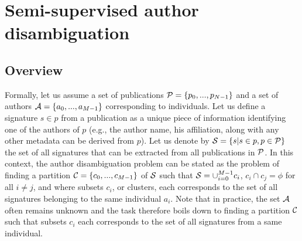 \documentclass{article}
\begin{document}

\section{Semi-supervised author disambiguation}
\label{methods}

\subsection{Overview}

Formally, let us assume a set of publications ${\cal P} = \{ p_0, ...,
p_{N-1}\}$ and a set of authors ${\cal A} = \{ a_0, ..., a_{M-1}\}$
corresponding to individuals.  Let us define a signature $s \in p$ from a
publication as a unique piece of information identifying one of the authors of
$p$ (e.g., the author name, his affiliation, along with any other metadata can
be derived from $p$). Let us denote by ${\cal S} = \{ s | s \in p, p \in {\cal
P} \}$ the set of all signatures that can be extracted from all publications in
${\cal P}$. In this context, the author disambiguation problem can be stated as
the problem of finding a partition ${\cal C} = \{ c_0, ..., c_{M-1} \}$ of
${\cal S}$ such that ${\cal S} = \cup_{i=0}^{M-1} c_i$, $c_i \cap c_j = \phi$
for all $i \neq j$, and where subsets $c_i$, or clusters, each corresponds to
the set of all signatures belonging to the same individual $a_i$. Note that in
practice, the set ${\cal A}$ often remains unknown and the task therefore boils
down to finding a partition ${\cal C}$ such that subsets   $c_i$  each
corresponds to the set of all signatures from a same individual.



\end{document}
